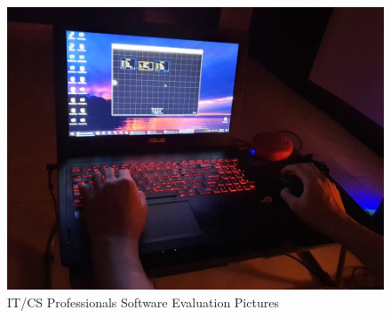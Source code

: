 \begin{figure}[H]
	 \centering
	 \includegraphics[width=\textwidth]{evaluators/f_jb.jpg}
	 \caption[]{IT/CS Professionals Software Evaluation Pictures}
\end{figure}

